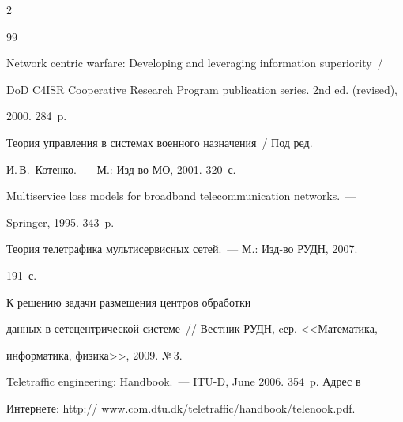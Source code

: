 \begin{multicols}{2}
{{\begin{thebibliography}{99}


  Network centric warfare: Developing and leveraging information superiority~/ 


DoD C4ISR Cooperative Research Program publication series. 2nd ed. (revised), 


2000. 284~p.


  






  Теория управления в системах военного назначения~/ Под ред.\ 


И.\,В.~Котенко.~--- М.: Изд-во МО, 2001. 320~с.


  






  Multiservice loss models for broadband telecommunication networks.~--- 


Springer, 1995. 343~p.


  






  Теория телетрафика мультисервисных сетей.~--- М.: Изд-во РУДН, 2007. 


191~с.


  






  К решению задачи размещения центров обработки 


данных в сетецентрической системе~// Вестник РУДН, cер. <<Математика, 


информатика, физика>>, 2009. №\,3.


  


  






  Teletraffic engineering: Handbook.~--- \mbox{ITU-D}, June 2006. 354~p. Адрес в 


Интернете: {\sf http:// www.com.dtu.dk/teletraffic/handbook/telenook.pdf}.






\end{thebibliography}}}
\end{multicols}
